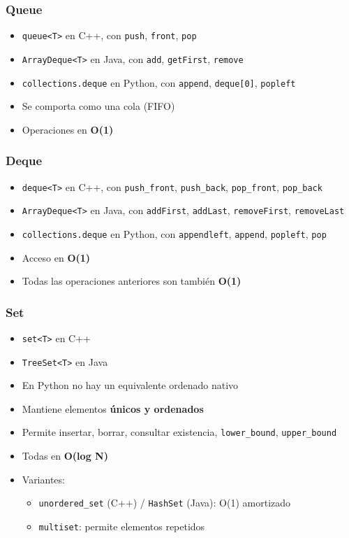\documentclass{beamer}
\begin{document}
\begin{frame}
  \frametitle{Queue}
  \begin{itemize}
    \item \texttt{queue<T>} en C++, con \texttt{push}, \texttt{front}, \texttt{pop}
    \item \texttt{ArrayDeque<T>} en Java, con \texttt{add}, \texttt{getFirst}, \texttt{remove}
    \item \texttt{collections.deque} en Python, con \texttt{append}, \texttt{deque[0]}, \texttt{popleft}
    \item Se comporta como una cola (FIFO)
    \item Operaciones en \textbf{O(1)}
  \end{itemize}
\end{frame}

\begin{frame}
  \frametitle{Deque}
  \begin{itemize}
    \item \texttt{deque<T>} en C++, con \texttt{push\_front}, \texttt{push\_back}, \texttt{pop\_front}, \texttt{pop\_back}
    \item \texttt{ArrayDeque<T>} en Java, con \texttt{addFirst}, \texttt{addLast}, \texttt{removeFirst}, \texttt{removeLast}
    \item \texttt{collections.deque} en Python, con \texttt{appendleft}, \texttt{append}, \texttt{popleft}, \texttt{pop}
    \item Acceso en \textbf{O(1)}
    \item Todas las operaciones anteriores son también \textbf{O(1)}
  \end{itemize}
\end{frame}

\begin{frame}
  \frametitle{Set}
  \begin{itemize}
    \item \texttt{set<T>} en C++
    \item \texttt{TreeSet<T>} en Java
    \item En Python no hay un equivalente ordenado nativo
    \item Mantiene elementos \textbf{únicos y ordenados}
    \item Permite insertar, borrar, consultar existencia, \texttt{lower\_bound}, \texttt{upper\_bound}
    \item Todas en \textbf{O(log N)}
    \item Variantes:
    \begin{itemize}
      \item \texttt{unordered\_set} (C++) / \texttt{HashSet} (Java): O(1) amortizado
      \item \texttt{multiset}: permite elementos repetidos
    \end{itemize}
  \end{itemize}
\end{frame}
\end{document}
